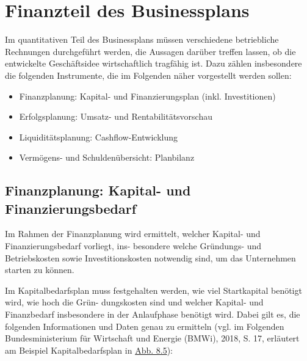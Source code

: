 \documentclass[
  letterpaper,
]{book}
\begin{document}
\section{Finanzteil des
Businessplans}\label{finanzteil-des-businessplans}

Im quantitativen Teil des Businessplans müssen verschiedene betriebliche
Rechnungen durchgeführt werden, die Aussagen darüber treffen lassen, ob
die entwickelte Geschäftsidee wirtschaftlich tragfähig ist. Dazu zählen
insbesondere die folgenden Instrumente, die im Folgenden näher
vorgestellt werden sollen:

\begin{itemize}
\item
  Finanzplanung: Kapital- und Finanzierungsplan (inkl. Investitionen)
\item
  Erfolgsplanung: Umsatz- und Rentabilitätsvorschau
\item
  Liquiditätsplanung: Cashflow-Entwicklung
\item
  Vermögens- und Schuldenübersicht: Planbilanz
\end{itemize}

\subsection{Finanzplanung: Kapital- und
Finanzierungsbedarf}\label{finanzplanung-kapital-und-finanzierungsbedarf}

Im Rahmen der Finanzplanung wird ermittelt, welcher Kapital- und
Finanzierungsbedarf vorliegt, ins- besondere welche Gründungs- und
Betriebskosten sowie Investitionskosten notwendig sind, um das
Unternehmen starten zu können.

Im Kapitalbedarfsplan muss festgehalten werden, wie viel Startkapital
benötigt wird, wie hoch die Grün- dungskosten sind und welcher Kapital-
und Finanzbedarf insbesondere in der Anlaufphase benötigt wird. Dabei
gilt es, die folgenden Informationen und Daten genau zu ermitteln (vgl.
im Folgenden Bundesministerium für Wirtschaft und Energie (BMWi), 2018,
S. 17, erläutert am Beispiel Kapitalbedarfsplan in
\hyperref[figure85]{Abb. 8.5}):
\end{document}
